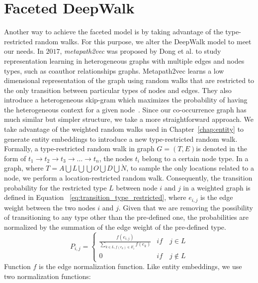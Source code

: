 \section{Faceted DeepWalk}\label{sec:faceted_deepwalk}
Another way to achieve the faceted model is by taking advantage of the type-restricted random walks. For this purpose, we alter the DeepWalk model to meet our needs. In $2017$, \emph{metapath2vec} was proposed by Dong et al. to study representation learning in heterogeneous graphs with multiple edges and nodes types, such as coauthor relationships graphs. Metapath2vec learns a low dimensional representation of the graph using random walks that are restricted to the only transition between particular types of nodes and edges. They also introduce a heterogeneous skip-gram which maximizes the probability of having the heterogeneous context for a given node~. Since our co-occurrence graph has much similar but simpler structure, we take a more straightforward approach. We take advantage of the weighted random walks used in Chapter~\ref{chap:entity} to generate entity embeddings to introduce a new type-restricted random walk. Formally, a type-restricted random walk in graph $G=(T,E)$is denoted in the form of $t_1 \rightarrow t_2 \rightarrow t_3\rightarrow \dots \rightarrow t_n$, the nodes $t_i$ belong to a certain node type. In a graph, where $T=A\bigcup  L\bigcup  \bigcup  O\bigcup  D\bigcup  \acute {N}$, to sample the only locations related to a node, we perform a location-restricted random walk. Consequently, the transition probability for the restricted type $L$ between node $i$ and $j$ in a weighted graph is defined in Equation ~\ref{eq:transition_type_restricted}, where $e_{i,j}$ is the edge weight between the two nodes $i$ and $j$. Given that we are removing the possibility of transitioning to any type other than the pre-defined one, the probabilities are normalized by the summation of the edge weight of the pre-defined type.
\begin{equation}
P_{ i,j }=\left\{ 
\begin{matrix}
 \frac { f(e_{ i,j }) }{ \sum _{ k\in L,f(e_{ k })\in E_{ i } }^{  }{ f(e_{ k }) }  }  & if\quad j\in L \\
0 & if\quad j\notin L
\end{matrix} 
\right. 
\label{eq:transition_type_restricted}
\end{equation} 
\noindent
Function $f$ is the edge normalization function. Like entity embeddings, we use two normalization functions: \\
